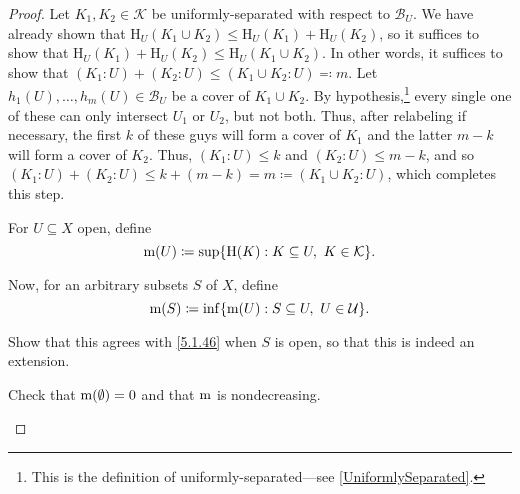 \begin{thm}
\begin{savenotes}
\begin{proof}
\label{Haar.8}
Let $K_1,K_2\in \mathcal{K}$ be uniformly-separated with respect to $\mathcal{B}_U$.  We have already shown that $\mathrm{H}_U(K_1\cup K_2)\leq \mathrm{H}_U(K_1)+\mathrm{H}_U(K_2)$, so it suffices to show that $\mathrm{H}_U(K_1)+\mathrm{H}_U(K_2)\leq \mathrm{H}_U(K_1\cup K_2)$.  In other words, it suffices to show that $(K_1:U)+(K_2:U)\leq (K_1\cup K_2:U)\eqqcolon m$.  Let $h_1(U),\ldots ,h_m(U)\in \mathcal{B}_U$ be a cover of $K_1\cup K_2$.  By hypothesis,\footnote{This is the definition of uniformly-separated---see \cref{UniformlySeparated}.} every single one of these can only intersect $U_1$ or $U_2$, but not both.  Thus, after relabeling if necessary, the first $k$ of these guys will form a cover of $K_1$ and the latter $m-k$ will form a cover of $K_2$.  Thus, $(K_1:U)\leq k$ and $(K_2:U)\leq m-k$, and so $(K_1:U)+(K_2:U)\leq k+(m-k)=m\coloneqq (K_1\cup K_2:U)$, which completes this step.

For $U\subseteq X$ open, define
\begin{equation}\label{5.1.46}
\mathrm{m} (U)\coloneqq \sup \{ \mathrm{H}(K):K\subseteq U,\ K\in \mathcal{K}\} .
\end{equation}

Now, for an arbitrary subsets $S$ of $X$, define
\begin{equation}\label{5.1.38}
\mathrm{m} (S)\coloneqq \inf \{ \mathrm{m} (U):S\subseteq U,\ U\in \mathcal{U}\} .
\end{equation}
\begin{exr}
Show that this agrees with \eqref{5.1.46} when $S$ is open, so that this is indeed an extension.
\end{exr}

\begin{exr}
Check that $\mathrm{m} (\emptyset )=0$ and that $\mathrm{m}$ is nondecreasing.
\end{exr}


\end{proof}
\end{savenotes}
\end{thm}
